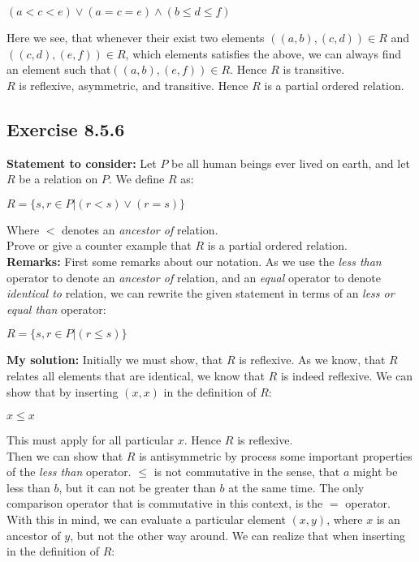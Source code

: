 \documentclass{report}
\newcommand{\cent}[1]{\begin{center}#1\end{center}}
\newcommand{\In}{\! \in \!}
\newcommand{\assignmentDescription}{\textbf{Statement to consider: }}
\newcommand{\myRemark}{\textbf{Remarks: }}
\newcommand{\solution}{\textbf{My solution: }}
\newcommand{\QED}{\boxed{}}
\newcommand{\Exercise}[1]{\subsection{Exercise #1}}
\begin{document}
	\cent{$(a < c < e) \vee (a = c = e) \wedge (b \leq d \leq f)$}
	
	Here we see, that whenever their exist two elements $((a,b),(c,d)) \In R$ and $((c,d),(e,f)) \In R$, which elements satisfies the above, we can always find an element such that$((a,b),(e,f)) \In R$. Hence $R$ is transitive.\\
	
	$R$ is reflexive, asymmetric, and transitive. Hence $R$ is a partial ordered relation.\\
	\QED
	
	\Exercise{8.5.6}
	
	\assignmentDescription
	Let $P$ be all human beings ever lived on earth, and let $R$ be a relation on $P$. We define $R$ as:
	
	\cent{$R = \{s,r \In P | (r < s) \vee (r = s)\}$}
	
	Where $<$ denotes an \textit{ancestor of} relation.\\
	
	Prove or give a counter example that $R$ is a partial ordered relation.\\
	
	\myRemark
	First some remarks about our notation. As we use the \textit{less than} operator to denote an \textit{ancestor of} relation, and an \textit{equal} operator to denote \textit{identical to} relation, we can rewrite the given statement in terms of an \textit{less or equal than} operator:
	
	\cent{$R = \{s,r \In P | (r \leq s)\}$}
	
	\solution
	Initially we must show, that $R$ is reflexive. As we know, that $R$ relates all elements that are identical, we know that $R$ is indeed reflexive. We can show that by inserting $ (x,x) $ in the definition of $R$:
	
	\cent{$x \leq x$}
	
	This must apply for all particular $x$. Hence $R$ is reflexive.\\
	
	Then we can show that $R$ is antisymmetric by process some important properties of the \textit{less than} operator. $\leq$ is not commutative in the sense, that $a$ might be less than $b$, but it can not be greater than $b$ at the same time. The only comparison operator that is commutative in this context, is the $=$ operator. With this in mind, we can evaluate a particular element $(x,y)$, where $x$ is an ancestor of $y$, but not the other way around. We can realize that when inserting in the definition of $R$:
	
\end{document}
